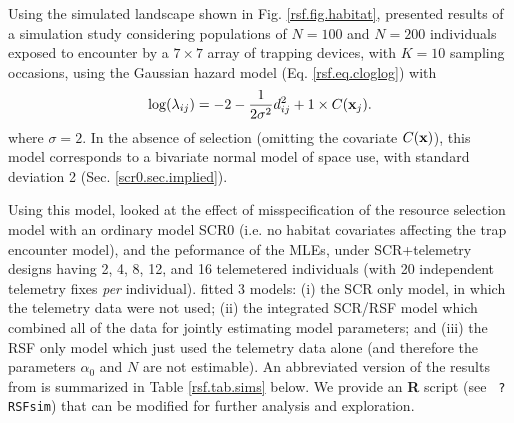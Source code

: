 Using the simulated landscape shown in Fig. \ref{rsf.fig.habitat},
\citep{royle_etal:2012mee} presented results of a simulation study
considering populations of $N=100$ and $N=200$ individuals exposed to
encounter by a 
 $7 \times 7$ array of trapping devices,
with $K=10$ sampling occasions, using 
the Gaussian hazard model
(Eq. \ref{rsf.eq.cloglog})
with 
\[
\log(\lambda_{ij}) = -2  -\frac{1}{2\sigma^{2}} d_{ij}^{2} + 1 \times C({\bf x}_{j}).
\]
where $\sigma =2$.
In the absence of selection (omitting the covariate $C({\bf x})$),
this model corresponds to a bivariate normal model of space use, 
with standard deviation 2 (Sec. \ref{scr0.sec.implied}).

Using this model, \citet{royle_etal:2012mee} looked at the effect of
misspecification of the resource selection model with an ordinary
model SCR0 (i.e. no habitat covariates affecting the trap encounter model), and the peformance of the MLEs, under SCR+telemetry
designs having 2, 4, 8, 12, and 16 telemetered individuals (with 20
independent telemetry fixes {\it per} individual). 
\citet{royle_etal:2012mee} fitted 3 models: (i) the SCR only model, in which the telemetry
data were not used; (ii) the integrated SCR/RSF model which combined
all of the data for jointly estimating model parameters; and (iii) the
RSF only model which just used the telemetry data alone (and therefore the parameters
$\alpha_{0}$ and $N$ are not estimable).  An abbreviated
version of the results from \citet{royle_etal:2012mee} is summarized
in Table \ref{rsf.tab.sims} below. We provide an {\bf R} script (see \mbox{\tt
  ?RSFsim}) that can be modified for further analysis and exploration.

